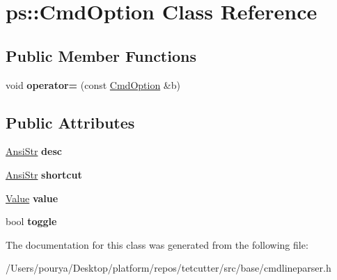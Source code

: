 \hypertarget{classps_1_1CmdOption}{}\section{ps\+:\+:Cmd\+Option Class Reference}
\label{classps_1_1CmdOption}
\subsection*{Public Member Functions}
\begin{DoxyCompactItemize}
\item 
\hypertarget{classps_1_1CmdOption_ab2a6449e9316add6ac621f423c4c4778}{}void {\bfseries operator=} (const \hyperlink{classps_1_1CmdOption}{Cmd\+Option} \&b)\label{classps_1_1CmdOption_ab2a6449e9316add6ac621f423c4c4778}

\end{DoxyCompactItemize}
\subsection*{Public Attributes}
\begin{DoxyCompactItemize}
\item 
\hypertarget{classps_1_1CmdOption_ac6937d8eb3a0e5b9acd9146af45d741b}{}\hyperlink{classps_1_1base_1_1CAString}{Ansi\+Str} {\bfseries desc}\label{classps_1_1CmdOption_ac6937d8eb3a0e5b9acd9146af45d741b}

\item 
\hypertarget{classps_1_1CmdOption_a4881b22ecfa544a550e1cebe370f59f2}{}\hyperlink{classps_1_1base_1_1CAString}{Ansi\+Str} {\bfseries shortcut}\label{classps_1_1CmdOption_a4881b22ecfa544a550e1cebe370f59f2}

\item 
\hypertarget{classps_1_1CmdOption_a6c1bc879cae2e6fa8cc250ac9fde5f10}{}\hyperlink{classps_1_1Value}{Value} {\bfseries value}\label{classps_1_1CmdOption_a6c1bc879cae2e6fa8cc250ac9fde5f10}

\item 
\hypertarget{classps_1_1CmdOption_a2ffac21f148356d325611e00471029fc}{}bool {\bfseries toggle}\label{classps_1_1CmdOption_a2ffac21f148356d325611e00471029fc}

\end{DoxyCompactItemize}


The documentation for this class was generated from the following file\+:\begin{DoxyCompactItemize}
\item 
/\+Users/pourya/\+Desktop/platform/repos/tetcutter/src/base/cmdlineparser.\+h\end{DoxyCompactItemize}
